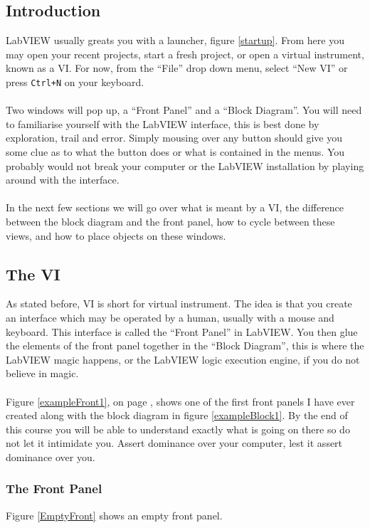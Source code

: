 	\subsection{Introduction}
	LabVIEW usually greats you with a launcher, figure \ref{startup}. From here you may open your recent projects, start a fresh project, or open a virtual instrument, known as a VI. For now, from the ``File'' drop down menu, select ``New VI'' or press \texttt{Ctrl+N} on your keyboard.\\
	\\
	Two windows will pop up, a ``Front Panel'' and a ``Block Diagram''. You will need to familiarise yourself with the LabVIEW interface, this is best done by exploration, trail and error. Simply mousing over any button should give you some clue as to what the button does or what is contained in the menus. You probably would not break your computer or the LabVIEW installation by playing around with the interface.\\
	\\
	In the next few sections we will go over what is meant by a VI, the difference between the block diagram and the front panel,
	how to cycle between these views, and how to place objects on these windows.
	\subsection{The VI}
	As stated before, VI is short for virtual instrument. The idea is that you create an interface which may be operated by a human, usually with a mouse and keyboard. This interface is called the ``Front Panel'' in LabVIEW. You then glue the elements of the front panel together in the ``Block Diagram'', this is where the LabVIEW magic happens, or the LabVIEW logic execution engine, if you do not believe in magic.\\
	\\
	Figure \ref{exampleFront1}, on page \pageref{exampleFront1}, shows one of the first front panels I have ever created along with the block diagram in figure \ref{exampleBlock1}. By the end of this course you will be able to understand exactly what is going on there so do not let it intimidate you. Assert dominance over your computer, lest it assert dominance over you. %
	\subsubsection{The Front Panel}
	Figure \ref{EmptyFront} shows an empty front panel. 
	
